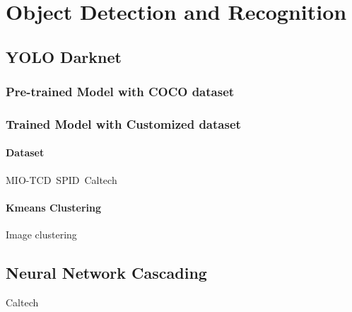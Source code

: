 \setcounter{secnumdepth}{5}


\chapter{Object Detection and Recognition}

\section{YOLO Darknet}
\subsection{Pre-trained Model with COCO dataset}
\subsection{Trained Model with Customized dataset}
\subsubsection{Dataset}
MIO-TCD\
SPID\
Caltech\
\subsubsection{Kmeans Clustering}
Image clustering 

\section{Neural Network Cascading}
Caltech
